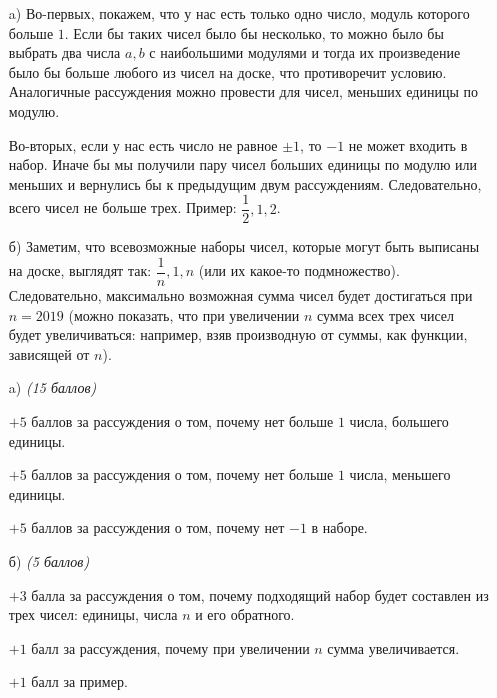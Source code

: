 \solutionSection
\begin{enumerate}

    \item[a)] Во-первых, покажем, что у нас есть только одно число, модуль которого больше $1$. Если бы таких чисел было бы несколько, то можно было бы выбрать два числа $a, b$ с наибольшими модулями и тогда их произведение было бы больше любого из чисел на доске, что противоречит условию. Аналогичные рассуждения можно провести для чисел, меньших единицы по модулю.
	
	Во-вторых, если у нас есть число не равное $\pm 1$, то $-1$ не может входить в набор. Иначе бы мы получили пару чисел больших единицы по модулю или меньших и вернулись бы к предыдущим двум рассуждениям. Следовательно, всего чисел не больше трех. Пример: $\dfrac{1}{2}, 1, 2$.

	\item[б)] Заметим, что всевозможные наборы чисел, которые могут быть выписаны на доске, выглядят так: $\dfrac{1}{n}, 1, n$ (или их какое-то подмножество). Следовательно, максимально возможная сумма чисел будет достигаться при $n = 2019$ (можно показать, что при увеличении $n$ сумма всех трех чисел будет увеличиваться: например, взяв производную от суммы, как функции, зависящей от $n$).
 
\end{enumerate}	


\additionalCriteria

\begin{enumerate}

    \item[a)] \textit{(15 баллов)}
	
	$+5$ баллов за рассуждения о том, почему нет больше $1$
	числа, большего единицы.
	
	$+5$ баллов за рассуждения о том, почему нет больше $1$
	числа, меньшего единицы.
	
	$+5$ баллов за рассуждения о том, почему нет $-1$ в наборе.
	
	\item[б)] \textit{(5 баллов)}

	$+3$ балла за рассуждения о том, почему подходящий набор
	будет составлен из трех чисел: единицы, числа $n$ и его обратного.
	
	$+1$ балл за рассуждения, 
	почему при увеличении $n$ сумма увеличивается.
	
	$+1$ балл за пример.
		
\end{enumerate}